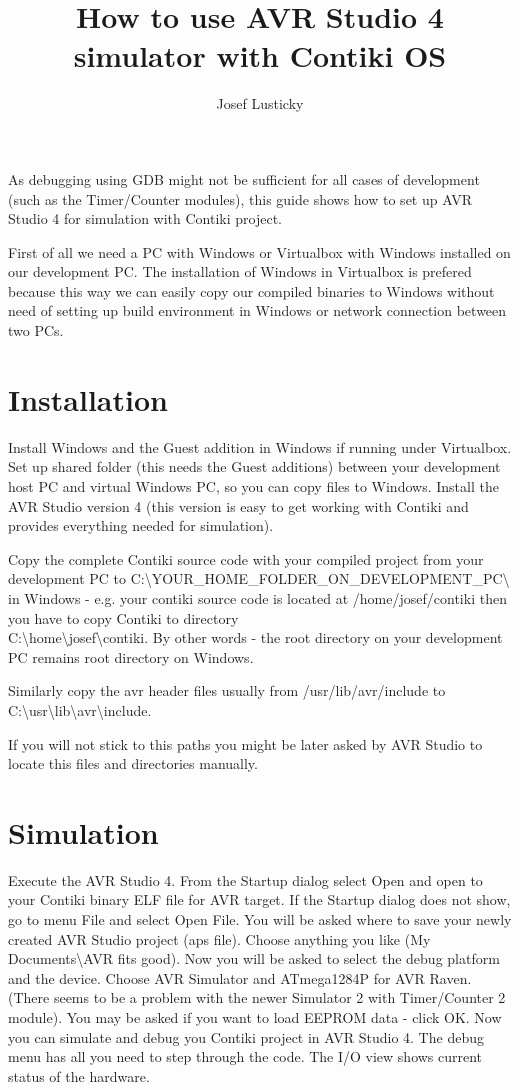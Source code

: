 \documentclass{article}
\begin{document}
\title{How to use AVR Studio 4 simulator with Contiki OS}
\author{Josef Lusticky}

\maketitle

As debugging using GDB might not be sufficient for all cases of development (such as the Timer/Counter modules),
this guide shows how to set up AVR Studio 4 for simulation with Contiki project.

First of all we need a PC with Windows or Virtualbox with Windows installed on our development PC.
The installation of Windows in Virtualbox is prefered because this way we can easily copy our compiled binaries to Windows
without need of setting up build environment in Windows or network connection between two PCs.

\section{Installation}
Install Windows and the Guest addition in Windows if running under Virtualbox.
Set up shared folder (this needs the Guest additions) between your development host PC and virtual Windows PC, so you can copy files to Windows.
Install the AVR Studio version 4 (this version is easy to get working with Contiki and provides everything needed for simulation).

Copy the complete Contiki source code with your compiled project from your development PC to
C:\textbackslash YOUR\_HOME\_FOLDER\_ON\_DEVELOPMENT\_PC\textbackslash
in Windows - e.g. your contiki source code is located at /home/josef/contiki
then you have to copy Contiki to directory \\
C:\textbackslash home\textbackslash josef\textbackslash contiki.
By other words - the root directory on your development PC remains root directory on Windows.

Similarly copy the avr header files usually from /usr/lib/avr/include to
C:\textbackslash usr\textbackslash lib\textbackslash avr\textbackslash include.

If you will not stick to this paths you might be later asked by AVR Studio to locate this files and directories manually.


\section{Simulation}
Execute the AVR Studio 4. From the Startup dialog select Open and open to your Contiki binary ELF file for AVR target.
If the Startup dialog does not show, go to menu File and select Open File.
You will be asked where to save your newly created AVR Studio project (aps file).
Choose anything you like (My Documents\textbackslash AVR fits good).
Now you will be asked to select the debug platform and the device.
Choose AVR Simulator and ATmega1284P for AVR Raven. (There seems to be a problem with the newer Simulator 2 with Timer/Counter 2 module).
You may be asked if you want to load EEPROM data - click OK.
Now you can simulate and debug you Contiki project in AVR Studio 4.
The debug menu has all you need to step through the code. The I/O view shows current status of the hardware.
\end{document}
